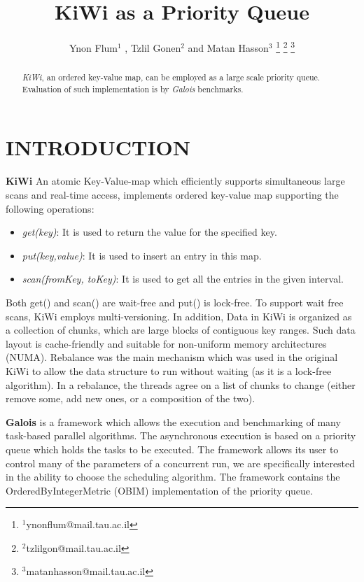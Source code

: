 \documentclass[letterpaper, 10 pt, conference]{ieeeconf}  %
\title{\LARGE \bf
KiWi as a Priority Queue
}
\author{Ynon Flum$^{1}$ , Tzlil Gonen$^{2}$ and Matan Hasson$^3$ %
\thanks{$^1$ynonflum@mail.tau.ac.il}%
\thanks{$^2$tzlilgon@mail.tau.ac.il}%
\thanks{$^3$matanhasson@mail.tau.ac.il}%
}
\begin{document}
\maketitle
\thispagestyle{empty}
\pagestyle{empty}


\begin{abstract}

\textit{KiWi}, an ordered key-value map, can be employed as a large scale priority queue. Evaluation of such implementation is by \textit{Galois} benchmarks.

\end{abstract}


\section{INTRODUCTION}

\textbf{KiWi} \cite{kiwi} An atomic Key-Value-map which efficiently supports simultaneous large scans and real-time access, implements ordered key-value map supporting the following operations:
\begin{itemize}
\item \textit{get(key)}: It is used to return the value for the specified key.
\end{itemize}
\begin{itemize}
\item \textit{put(key,value)}: It is used to insert an entry in this map.
\item \textit{scan(fromKey, toKey)}: It is used to get all the entries in the given interval.
\end{itemize}
Both get() and scan() are wait-free and put() is lock-free. To support wait free scans, KiWi employs multi-versioning. In addition, Data in KiWi is organized as a collection of chunks, which are large blocks of contiguous key ranges. Such data layout is cache-friendly and suitable for non-uniform memory architectures (NUMA).
Rebalance was the main mechanism which was used in the original KiWi to allow the data structure to run without waiting (as it is a lock-free algorithm).
In a rebalance, the threads agree on a list of chunks to change (either remove some, add new ones, or a composition of the two).


\textbf{Galois} \cite{galios} is a framework which allows the execution and benchmarking of many task-based parallel algorithms. The asynchronous execution is based on a priority queue which holds the tasks to be executed. The framework allows its user to control many of the parameters of a concurrent run, we are specifically interested in the ability to choose the scheduling algorithm. The framework contains the OrderedByIntegerMetric (OBIM) implementation of the priority queue. 
\end{document}
